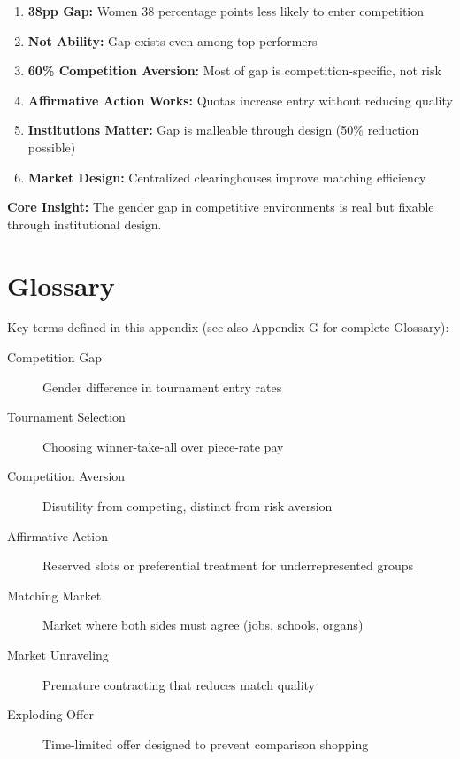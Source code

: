 \begin{tcolorbox}[colback=gray!10!white,colframe=gray!50!black,title=Key Takeaways]
\begin{enumerate}
    \item \textbf{38pp Gap:} Women 38 percentage points less likely to enter competition
    \item \textbf{Not Ability:} Gap exists even among top performers
    \item \textbf{60\% Competition Aversion:} Most of gap is competition-specific, not risk
    \item \textbf{Affirmative Action Works:} Quotas increase entry without reducing quality
    \item \textbf{Institutions Matter:} Gap is malleable through design (50\% reduction possible)
    \item \textbf{Market Design:} Centralized clearinghouses improve matching efficiency
\end{enumerate}

\textbf{Core Insight:} The gender gap in competitive environments is real but fixable through institutional design.
\end{tcolorbox}

\section{Glossary}

Key terms defined in this appendix (see also Appendix G for complete Glossary):

\begin{description}
    \item[Competition Gap] Gender difference in tournament entry rates
    \item[Tournament Selection] Choosing winner-take-all over piece-rate pay
    \item[Competition Aversion] Disutility from competing, distinct from risk aversion
    \item[Affirmative Action] Reserved slots or preferential treatment for underrepresented groups
    \item[Matching Market] Market where both sides must agree (jobs, schools, organs)
    \item[Market Unraveling] Premature contracting that reduces match quality
    \item[Exploding Offer] Time-limited offer designed to prevent comparison shopping
\end{description}


